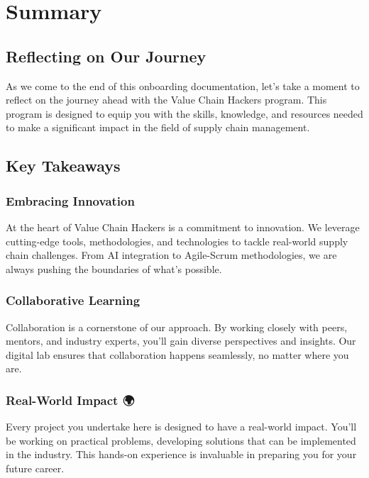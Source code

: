 \documentclass[
  letterpaper,
  DIV=11,
  numbers=noendperiod]{scrreprt}
\begin{document}

\chapter{Summary}\label{summary-1}

\section{Reflecting on Our Journey 🚀}\label{reflecting-on-our-journey}

As we come to the end of this onboarding documentation, let's take a
moment to reflect on the journey ahead with the Value Chain Hackers
program. This program is designed to equip you with the skills,
knowledge, and resources needed to make a significant impact in the
field of supply chain management.

\section{Key Takeaways}\label{key-takeaways}

\subsection{Embracing Innovation 🌟}\label{embracing-innovation}

At the heart of Value Chain Hackers is a commitment to innovation. We
leverage cutting-edge tools, methodologies, and technologies to tackle
real-world supply chain challenges. From AI integration to Agile-Scrum
methodologies, we are always pushing the boundaries of what's possible.

\subsection{Collaborative Learning 🤝}\label{collaborative-learning}

Collaboration is a cornerstone of our approach. By working closely with
peers, mentors, and industry experts, you'll gain diverse perspectives
and insights. Our digital lab ensures that collaboration happens
seamlessly, no matter where you are.

\subsection{Real-World Impact 🌍}\label{real-world-impact-1}

Every project you undertake here is designed to have a real-world
impact. You'll be working on practical problems, developing solutions
that can be implemented in the industry. This hands-on experience is
invaluable in preparing you for your future career.
\end{document}
